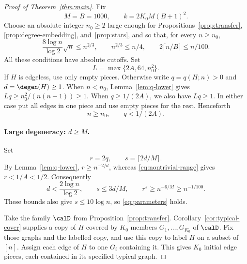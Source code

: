 \begin{proof}[Proof of Theorem~\ref{thm:main}]
Fix
\begin{equation}\label{eq:constants}
 M=B=1000,\qquad k=2K_0M(B+1)^2.
\end{equation}
Choose an absolute integer $n_0\geq2$ large enough for
Propositions~\ref{prop:transfer}, \ref{prop:degree-embedding},
and~\ref{prop:stars}, and so that, for every $n\geq n_0$,
\begin{equation}\label{eq:deterministic-cutoffs}
 \frac{8\log n}{\log2}\sqrt n\leq n^{2/3},\qquad
 n^{2/3}\leq n/4,\qquad
 2\lceil n/B\rceil\leq n/100.
\end{equation}
All these conditions have absolute cutoffs. Set
\[
 L=\max\{2A,64,n_0^2\}.
\]
If $H$ is edgeless, use only empty pieces. Otherwise write
$q=q(H;n)>0$ and $d=\degen(H)\geq1$.
When $n<n_0$, Lemma~\ref{lem:q-lower} gives
$Lq\geq n_0^2/(n(n-1))\geq1$. When $q\geq1/(2A)$,
we also have $Lq\geq1$. In either case put all edges in one
piece and use empty pieces for the rest. Henceforth
\begin{equation}\label{eq:nontrivial-range}
 n\geq n_0,\qquad q<1/(2A).
\end{equation}

\paragraph{Large degeneracy: $d\geq M$.}
Set
\[
 r=2q,\qquad s=\lceil2d/M\rceil.
\]
By Lemma~\ref{lem:q-lower}, $r\geq n^{-2/d}$, whereas
\eqref{eq:nontrivial-range} gives $r<1/A<1/2$. Consequently
\begin{equation}\label{eq:d-upper}
 d<\frac{2\log n}{\log2},\qquad s\leq3d/M,
 \qquad r^s\geq n^{-6/M}\geq n^{-1/100}.
\end{equation}
These bounds also give $s\leq10\log n$, so
\eqref{eq:parameters} holds.

Take the family $\calD$ from Proposition~\ref{prop:transfer}.
Corollary~\ref{cor:typical-cover} supplies a copy of $H$ covered
by $K_0$ members $G_1,\ldots,G_{K_0}$ of $\calD$.
Fix those graphs and the labelled copy, and use this copy to
label $H$ on a subset of $[n]$. Assign each edge of $H$ to
one $G_i$ containing it. This gives $K_0$ initial edge pieces,
each contained in its specified typical graph.


\end{proof}
